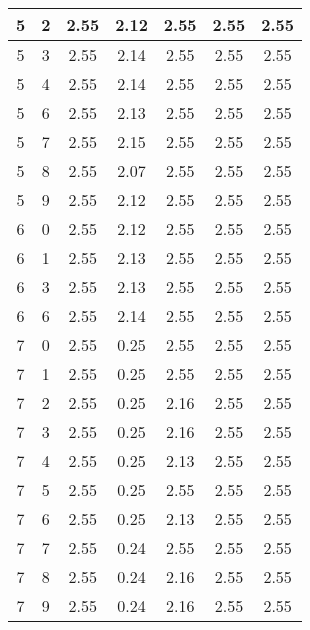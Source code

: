 \begin{longtable}{|c|c||c||c|c||c|c|}
	5 & 2 & 2.55 & 2.12 & 2.55 & 2.55 & 2.55 \\ \hline
	5 & 3 & 2.55 & 2.14 & 2.55 & 2.55 & 2.55 \\ \hline
	5 & 4 & 2.55 & 2.14 & 2.55 & 2.55 & 2.55 \\ \hline
	5 & 6 & 2.55 & 2.13 & 2.55 & 2.55 & 2.55 \\ \hline
	5 & 7 & 2.55 & 2.15 & 2.55 & 2.55 & 2.55 \\ \hline
	5 & 8 & 2.55 & 2.07 & 2.55 & 2.55 & 2.55 \\ \hline
	5 & 9 & 2.55 & 2.12 & 2.55 & 2.55 & 2.55 \\ \hline
	6 & 0 & 2.55 & 2.12 & 2.55 & 2.55 & 2.55 \\ \hline
	6 & 1 & 2.55 & 2.13 & 2.55 & 2.55 & 2.55 \\ \hline
	6 & 3 & 2.55 & 2.13 & 2.55 & 2.55 & 2.55 \\ \hline
	6 & 6 & 2.55 & 2.14 & 2.55 & 2.55 & 2.55 \\ \hline
	7 & 0 & 2.55 & 0.25 & 2.55 & 2.55 & 2.55 \\ \hline
	7 & 1 & 2.55 & 0.25 & 2.55 & 2.55 & 2.55 \\ \hline
	7 & 2 & 2.55 & 0.25 & 2.16 & 2.55 & 2.55 \\ \hline
	7 & 3 & 2.55 & 0.25 & 2.16 & 2.55 & 2.55 \\ \hline
	7 & 4 & 2.55 & 0.25 & 2.13 & 2.55 & 2.55 \\ \hline
	7 & 5 & 2.55 & 0.25 & 2.55 & 2.55 & 2.55 \\ \hline
	7 & 6 & 2.55 & 0.25 & 2.13 & 2.55 & 2.55 \\ \hline
	7 & 7 & 2.55 & 0.24 & 2.55 & 2.55 & 2.55 \\ \hline
	7 & 8 & 2.55 & 0.24 & 2.16 & 2.55 & 2.55 \\ \hline
	7 & 9 & 2.55 & 0.24 & 2.16 & 2.55 & 2.55 \\ \hline
\end{longtable}
\clearpage{}
